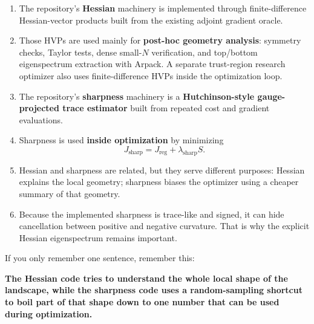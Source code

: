 \documentclass[11pt,letterpaper]{article}
\begin{document}
\begin{enumerate}[leftmargin=*]
  \item The repository's \textbf{Hessian} machinery is implemented through
  finite-difference Hessian-vector products built from the existing adjoint
  gradient oracle.
  \item Those HVPs are used mainly for \textbf{post-hoc geometry analysis}:
  symmetry checks, Taylor tests, dense small-$N$ verification, and top/bottom
  eigenspectrum extraction with Arpack. A separate trust-region research
  optimizer also uses finite-difference HVPs inside the optimization loop.
  \item The repository's \textbf{sharpness} machinery is a
  \textbf{Hutchinson-style gauge-projected trace estimator} built from repeated
  cost and gradient evaluations.
  \item Sharpness is used \textbf{inside optimization} by minimizing
  \[
  J_{\mathrm{sharp}} = J_{\mathrm{reg}} + \lambda_{\mathrm{sharp}} S.
  \]
  \item Hessian and sharpness are related, but they serve different purposes:
  Hessian explains the local geometry; sharpness biases the optimizer using a
  cheaper summary of that geometry.
  \item Because the implemented sharpness is trace-like and signed, it can hide
  cancellation between positive and negative curvature. That is why the
  explicit Hessian eigenspectrum remains important.
\end{enumerate}

\begin{takeaway}
If you only remember one sentence, remember this:

\textbf{The Hessian code tries to understand the whole local shape of the
landscape, while the sharpness code uses a random-sampling shortcut to boil
part of that shape down to one number that can be used during optimization.}
\end{takeaway}
\end{document}
